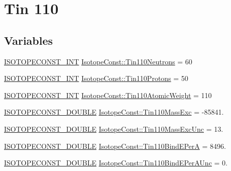 \hypertarget{group___isotope_const-_tin-_sn110}{}\section{Tin 110}
\label{group___isotope_const-_tin-_sn110}
\subsection*{Variables}
\begin{DoxyCompactItemize}
\item 
\mbox{\hyperlink{group___isotope_const-_macros_ga5f18360b3e99483a35c32d789e62621c}{I\+S\+O\+T\+O\+P\+E\+C\+O\+N\+S\+T\+\_\+\+I\+NT}} \mbox{\hyperlink{group___isotope_const-_tin-_sn110_ga7c611ed2d4f660d4dc0a004a39812d69}{Isotope\+Const\+::\+Tin110\+Neutrons}} = 60
\item 
\mbox{\hyperlink{group___isotope_const-_macros_ga5f18360b3e99483a35c32d789e62621c}{I\+S\+O\+T\+O\+P\+E\+C\+O\+N\+S\+T\+\_\+\+I\+NT}} \mbox{\hyperlink{group___isotope_const-_tin-_sn110_gacfbfe5599c213fd7b456be903cb041c4}{Isotope\+Const\+::\+Tin110\+Protons}} = 50
\item 
\mbox{\hyperlink{group___isotope_const-_macros_ga5f18360b3e99483a35c32d789e62621c}{I\+S\+O\+T\+O\+P\+E\+C\+O\+N\+S\+T\+\_\+\+I\+NT}} \mbox{\hyperlink{group___isotope_const-_tin-_sn110_ga7f3c9dbd41960a788af23739436e14f4}{Isotope\+Const\+::\+Tin110\+Atomic\+Weight}} = 110
\item 
\mbox{\hyperlink{group___isotope_const-_macros_ga8f45a7272ce02c0b4c65c44636ed719a}{I\+S\+O\+T\+O\+P\+E\+C\+O\+N\+S\+T\+\_\+\+D\+O\+U\+B\+LE}} \mbox{\hyperlink{group___isotope_const-_tin-_sn110_ga8d37d1879ad1b71aa2de8b617d2e56da}{Isotope\+Const\+::\+Tin110\+Mass\+Exc}} = -\/85841.
\item 
\mbox{\hyperlink{group___isotope_const-_macros_ga8f45a7272ce02c0b4c65c44636ed719a}{I\+S\+O\+T\+O\+P\+E\+C\+O\+N\+S\+T\+\_\+\+D\+O\+U\+B\+LE}} \mbox{\hyperlink{group___isotope_const-_tin-_sn110_ga858132e576ce9a8b1d707f02c0429fac}{Isotope\+Const\+::\+Tin110\+Mass\+Exc\+Unc}} = 13.
\item 
\mbox{\hyperlink{group___isotope_const-_macros_ga8f45a7272ce02c0b4c65c44636ed719a}{I\+S\+O\+T\+O\+P\+E\+C\+O\+N\+S\+T\+\_\+\+D\+O\+U\+B\+LE}} \mbox{\hyperlink{group___isotope_const-_tin-_sn110_ga7c9bdc321196b941e2bd55036bf8f2c9}{Isotope\+Const\+::\+Tin110\+Bind\+E\+PerA}} = 8496.
\item 
\mbox{\hyperlink{group___isotope_const-_macros_ga8f45a7272ce02c0b4c65c44636ed719a}{I\+S\+O\+T\+O\+P\+E\+C\+O\+N\+S\+T\+\_\+\+D\+O\+U\+B\+LE}} \mbox{\hyperlink{group___isotope_const-_tin-_sn110_ga1d44fa9dc4a14df751196ece4b6556ec}{Isotope\+Const\+::\+Tin110\+Bind\+E\+Per\+A\+Unc}} = 0.

\end{DoxyCompactItemize}
